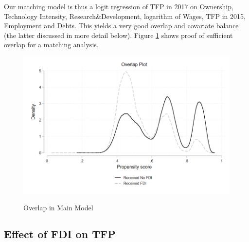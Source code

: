 \documentclass[a4paper,11pt]{scrartcl}
\begin{document}
Our matching model is thus a logit regression of TFP in 2017 on Ownership, Technology Intensity, Research\&Development, logarithm of Wages, TFP in 2015, Employment and Debts. This yields a very good overlap and covariate balance (the latter discussed in more detail below). Figure \ref{fig:overlap} shows proof of sufficient overlap for a matching analysis. 

\begin{figure}[h]\centering
	\caption{Overlap in Main Model}
	\includegraphics[width=\textwidth]{overlap}
  	\label{fig:overlap}
\end{figure} 

\subsection{Effect of FDI on TFP}

\end{document}
